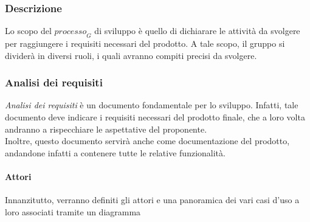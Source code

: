 \subsubsection{Descrizione}
Lo scopo del $\textit{processo}_G$ di sviluppo è quello di dichiarare le attività da svolgere per raggiungere i requisiti necessari del prodotto.
A tale scopo, il gruppo si dividerà in diversi ruoli, i quali avranno compiti precisi da svolgere.
\subsubsection{Analisi dei requisiti}
\textit{Analisi dei requisiti} è un documento fondamentale per lo sviluppo. Infatti, tale documento deve indicare i requisiti necessari del prodotto finale, che a loro volta andranno a rispecchiare le aspettative del proponente. \\
Inoltre, questo documento servirà anche come documentazione del prodotto, andandone infatti a contenere tutte le relative funzionalità.
\paragraph{Attori} 
Innanzitutto, verranno definiti gli attori e una panoramica dei vari casi d'uso a loro associati tramite un diagramma
